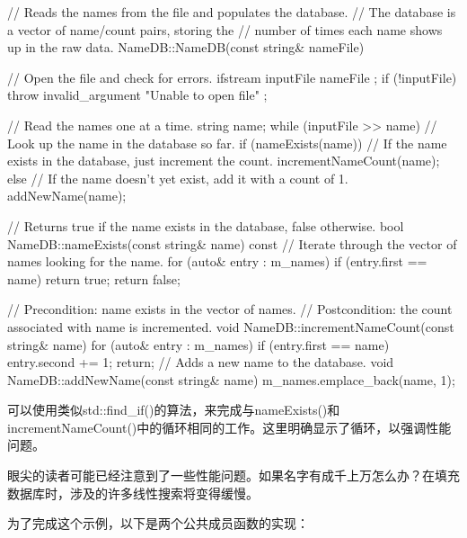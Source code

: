 \begin{cpp}
// Reads the names from the file and populates the database.
// The database is a vector of name/count pairs, storing the
// number of times each name shows up in the raw data.
NameDB::NameDB(const string& nameFile)
{
    // Open the file and check for errors.
    ifstream inputFile { nameFile };
    if (!inputFile) {
        throw invalid_argument { "Unable to open file" };
    }

    // Read the names one at a time.
    string name;
    while (inputFile >> name) {
        // Look up the name in the database so far.
        if (nameExists(name)) {
            // If the name exists in the database, just increment the count.
            incrementNameCount(name);
        } else {
            // If the name doesn't yet exist, add it with a count of 1.
            addNewName(name);
        }
    }
}

// Returns true if the name exists in the database, false otherwise.
bool NameDB::nameExists(const string& name) const
{
    // Iterate through the vector of names looking for the name.
    for (auto& entry : m_names) {
        if (entry.first == name) {
            return true;
        }
    }
    return false;
}

// Precondition: name exists in the vector of names.
// Postcondition: the count associated with name is incremented.
void NameDB::incrementNameCount(const string& name)
{
    for (auto& entry : m_names) {
        if (entry.first == name) {
            entry.second += 1;
            return;
        }
    }
}
// Adds a new name to the database.
void NameDB::addNewName(const string& name)
{
    m_names.emplace_back(name, 1);
}
\end{cpp}

可以使用类似std::find\_if()的算法，来完成与nameExists()和incrementNameCount()中的循环相同的工作。这里明确显示了循环，以强调性能问题。

眼尖的读者可能已经注意到了一些性能问题。如果名字有成千上万怎么办？在填充数据库时，涉及的许多线性搜索将变得缓慢。

为了完成这个示例，以下是两个公共成员函数的实现：

